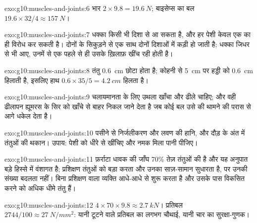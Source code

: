 \begin{solution}{exo:g10:muscles-and-joints:6}
भार $2 \times 9.8 = \qty{19.6}{N}$; बाइसेप्स का बल $19.6 \times 32/4
\approx \qty{157}{N}$।
\end{solution}

\begin{solution}{exo:g10:muscles-and-joints:7}
धक्का किसी भी दिशा से आ सकता है, और हर पेशी केवल एक का ही विरोध कर सकती
है। दोनों के सिकुड़ने से  एक साथ दोनों दिशाओं में कड़ी हो जाती है;
धक्का जिधर से भी आए, उनमें से एक पहले से ही उसके ख़िलाफ़ खींच रही होती है।
\end{solution}

\begin{solution}{exo:g10:muscles-and-joints:8}
तंतु \qty{0.6}{cm} छोटा होता है;  कोहनी से \qty{5}{cm} पर हड्डी को
\qty{0.6}{cm} हिलाती है, इसलिए हाथ $0.6 \times 35/5 = \qty{4.2}{cm}$
हिलता है।
\end{solution}

\begin{solution}{exo:g10:muscles-and-joints:9}
चलायमानता के लिए उथला खाँचा और ढीले  चाहिए; और वही ढीलापन ह्यूमरस
के सिर को खाँचे से बाहर निकल जाने देता है जब कोई बल उसे  की थामने
की परास से आगे धकेल देता है।
\end{solution}

\begin{solution}{exo:g10:muscles-and-joints:10}
पसीने से निर्जलीकरण और लवण की हानि, और दौड़ के अंत में तंतुओं की थकान।
उपाय: पेशी को धीरे से खींचिए और नमक मिला पानी पीजिए।
\end{solution}

\begin{solution}{exo:g10:muscles-and-joints:11}
फ़र्राटा धावक की जाँघ 70\% तेज़ तंतुओं की है और यह अनुपात बड़े हिस्से में
वंशागत है; प्रशिक्षण तंतुओं को बड़ा करता और उनका साज़-सामान सुधारता है,
पर उनकी संख्या बदलता नहीं। बिना प्रशिक्षण वाला व्यक्ति आधे-आधे से शुरू
करता है और उसके पास विकसित करने को अधिक धीमे तंतु हैं।
\end{solution}

\begin{solution}{exo:g10:muscles-and-joints:12}
$4 \times 70 \times 9.8 \approx \qty{2.7}{kN}$। प्रतिबल $2744/100
\approx \qty{27}{N/mm^2}$: यानी टूटने वाले प्रतिबल का लगभग चौथाई, यानी
चार का सुरक्षा-गुणक।
\end{solution}

